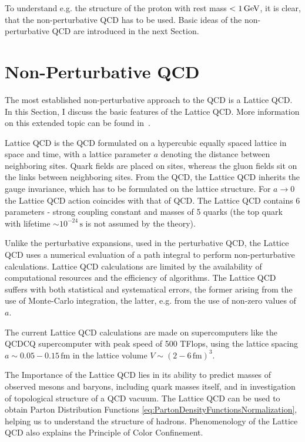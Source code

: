 To understand e.g. the structure of the proton with rest mass $< 1\,\text{GeV}$, it is
clear, that the 
non-perturbative QCD has to be used. Basic ideas of the non-perturbative QCD are
introduced in the next Section. 

\section{Non-Perturbative QCD}

The most established non-perturbative approach to the QCD is a Lattice QCD.
In this Section, I discuss the basic features of the Lattice QCD. More
information on this extended topic can be found in~\cite{QCDTextbook,LQCDIntro}.

Lattice QCD is the QCD formulated on a hypercubic equally spaced lattice in
space and time, with a lattice parameter $a$ denoting the distance between
neighboring sites.
Quark fields are placed on sites, whereas the gluon fields sit on the links
between neighboring sites. From the QCD, the Lattice QCD inherits the gauge
invariance, which has to be formulated on the lattice structure.
For $a \rightarrow 0$ the Lattice QCD action coincides with that of QCD. 
The Lattice QCD contains 6 parameters - strong coupling constant and masses of 5
quarks (the top quark with lifetime $ \sim 10^{-24}\,\text{s}$ is not assumed by
the theory).

Unlike the perturbative expansions, used in the perturbative QCD, the Lattice QCD
uses a numerical evaluation of a path integral to perform non-perturbative
calculations. 
Lattice QCD calculations are limited by the availability of computational
resources and the efficiency of algorithms. The Lattice QCD suffers with both
statistical and systematical errors, the former arising from the use of
Monte-Carlo integration, the latter, e.g. from the use of non-zero values of
$a$.

The current Lattice QCD calculations are made on supercomputers like the QCDCQ
supercomputer \cite{SuperComputer} with peak speed of 500 TFlops, using the lattice
spacing $a \sim 0.05 - 0.15 \, \text{fm}$ in the lattice volume $V \sim (2 - 6
\,\text{fm} )^3$.

The Importance of the Lattice QCD lies in its ability to predict masses of observed
mesons and baryons, including quark masses itself, and in investigation of
topological structure of a QCD vacuum.  The Lattice QCD can be used to obtain
Parton Distribution Functions
\eqref{eq:PartonDensityFunctionsNormalization}, helping us to understand the
structure of hadrons. Phenomenology of the Lattice QCD also explains the Principle of Color
Confinement. 


